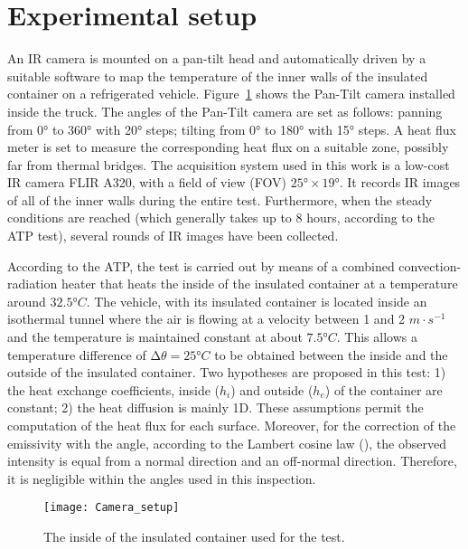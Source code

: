 \documentclass{tQRT2e}
\begin{document}
\section{Experimental setup}
An IR camera is mounted on a pan-tilt head and automatically driven by a suitable software to map the temperature of the inner walls of the insulated container on a refrigerated vehicle. Figure~\ref{Exp_setup} shows the Pan-Tilt camera installed inside the truck. The angles of the Pan-Tilt camera are set as follows: panning from 0° to 360° with 20° steps; tilting from 0° to 180° with 15° steps. A heat flux meter is set to measure the corresponding heat flux on a suitable zone, possibly far from thermal bridges. The acquisition system used in this work is a low-cost IR camera FLIR A320, with a field of view (FOV) $ 25°×19° $. It records IR images of all of the inner walls during the entire test. Furthermore, when the steady conditions are reached (which generally takes up to 8 hours, according to the ATP test), several rounds of IR images have been collected.

According to the ATP, the test is carried out by means of a combined convection-radiation heater that heats the inside of the insulated container at a temperature around $ 32.5°C $. The vehicle, with its insulated container is located inside an isothermal tunnel where the air is flowing at a velocity between 1 and 2 $ m⋅s^{−1} $ and the temperature is maintained constant at about $ 7.5 °C $. This allows a temperature difference of $ ∆\theta  = 25°C$ to be obtained between the inside and the outside of the insulated container. Two hypotheses are proposed in this test: 1) the heat exchange coefficients, inside ($ h_i $) and outside ($ h_e $) of the container are constant; 2) the heat diffusion is mainly 1D. These assumptions permit the computation of the heat flux for each surface. Moreover, for the correction of the emissivity with the angle, according to the Lambert cosine law (\cite{dragano2009experimental,Hottel1967a}), the observed intensity is equal from a normal direction and an off-normal direction. Therefore, it is negligible within the angles used  in this inspection.
\begin{figure}[ht]
	\centering
	\texttt{[image: Camera\_setup]}
	\caption{The inside of the insulated container used for the test.}
	\label{Exp_setup}
\end{figure}
\end{document}

